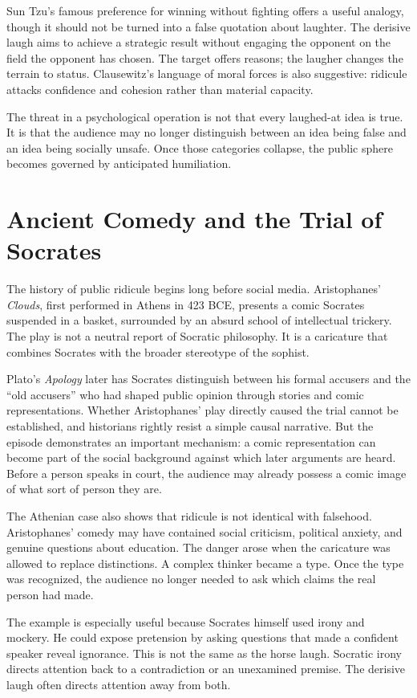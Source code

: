 ﻿\documentclass[12pt,a4paper]{book}
\begin{document}
Sun Tzu's famous preference for winning without fighting offers a useful analogy, though it should not be turned into a false quotation about laughter. The derisive laugh aims to achieve a strategic result without engaging the opponent on the field the opponent has chosen. The target offers reasons; the laugher changes the terrain to status. Clausewitz's language of moral forces is also suggestive: ridicule attacks confidence and cohesion rather than material capacity.

The threat in a psychological operation is not that every laughed-at idea is true. It is that the audience may no longer distinguish between an idea being false and an idea being socially unsafe. Once those categories collapse, the public sphere becomes governed by anticipated humiliation.

\section{Ancient Comedy and the Trial of Socrates}

The history of public ridicule begins long before social media. Aristophanes' \emph{Clouds}, first performed in Athens in 423 BCE, presents a comic Socrates suspended in a basket, surrounded by an absurd school of intellectual trickery. The play is not a neutral report of Socratic philosophy. It is a caricature that combines Socrates with the broader stereotype of the sophist.

Plato's \emph{Apology} later has Socrates distinguish between his formal accusers and the ``old accusers'' who had shaped public opinion through stories and comic representations. Whether Aristophanes' play directly caused the trial cannot be established, and historians rightly resist a simple causal narrative. But the episode demonstrates an important mechanism: a comic representation can become part of the social background against which later arguments are heard. Before a person speaks in court, the audience may already possess a comic image of what sort of person they are.

The Athenian case also shows that ridicule is not identical with falsehood. Aristophanes' comedy may have contained social criticism, political anxiety, and genuine questions about education. The danger arose when the caricature was allowed to replace distinctions. A complex thinker became a type. Once the type was recognized, the audience no longer needed to ask which claims the real person had made.

The example is especially useful because Socrates himself used irony and mockery. He could expose pretension by asking questions that made a confident speaker reveal ignorance. This is not the same as the horse laugh. Socratic irony directs attention back to a contradiction or an unexamined premise. The derisive laugh often directs attention away from both.
\end{document}
